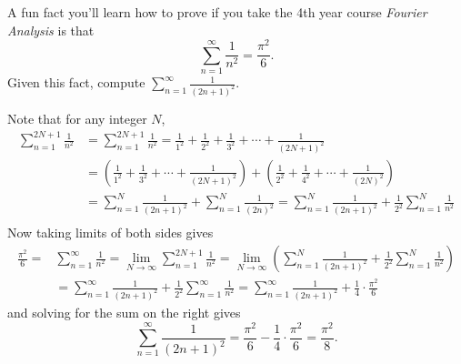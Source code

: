 \documentclass[11pt,dvipsnames]{book}
\numberwithin{equation}{section} %
\numberwithin{figure}{section} %
\numberwithin{table}{section} %
\begin{document}
\begin{exercise}
 A fun fact you'll learn how to prove if you take the 4th year course {\it Fourier Analysis} is that
\[
\sum_{n=1}^{\infty}\frac{1}{n^2}=\frac{\pi^{2}}{6}.
\]
Given this fact, compute $\sum_{n=1}^{\infty}\frac{1}{(2n+1)^2}$. 

\begin{solution}
Note that  for any integer $N$,
\begin{align*}
\sum_{n=1}^{2N+1}\frac{1}{n^{2}}
& =
\sum_{n=1}^{2N+1}\frac{1}{n^{2}}
=\frac{1}{1^{2}}+\frac{1}{2^{2}}+\frac{1}{3^{2}}+\cdots + \frac{1}{(2N+1)^2}\\
& =\left(\frac{1}{1^{2}}+\frac{1}{3^{2}}+\cdots + \frac{1}{(2N+1)^2}\right)
+\left(\frac{1}{2^{2}}+\frac{1}{4^{2}}+\cdots + \frac{1}{(2N)^2}\right)\\
& =\sum_{n=1}^{N}\frac{1}{(2n+1)^{2}}+ \sum_{n=1}^{N}\frac{1}{(2n)^{2}}
= \sum_{n=1}^{N}\frac{1}{(2n+1)^{2}}+\frac{1}{2^2} \sum_{n=1}^{N}\frac{1}{n^{2}}\\
\end{align*}
Now taking limits of both sides gives
\begin{align*}
\frac{\pi^{2}}{6} = 
& \sum_{n=1}^{\infty}\frac{1}{n^2}
=\lim_{N\rightarrow\infty}\sum_{n=1}^{2N+1}\frac{1}{n^{2}}
 =\lim_{N\rightarrow\infty} \left(\sum_{n=1}^{N}\frac{1}{(2n+1)^{2}}+\frac{1}{2^2} \sum_{n=1}^{N}\frac{1}{n^{2}}\right) \\
& =\sum_{n=1}^{\infty}\frac{1}{(2n+1)^{2}}+ \frac{1}{2^2} \sum_{n=1}^{\infty}\frac{1}{n^{2}}
 = \sum_{n=1}^{\infty}\frac{1}{(2n+1)^{2}}+ \frac{1}{4} \cdot \frac{\pi^{2}}{6}
\end{align*}
and solving for the sum on the right gives
\[
\sum_{n=1}^{\infty}\frac{1}{(2n+1)^{2}}= \frac{\pi^{2}}{6} - \frac{1}{4} \cdot \frac{\pi^{2}}{6}=\frac{\pi^{2}}{8}.
\]




\end{solution}
\end{exercise}





\end{document}
